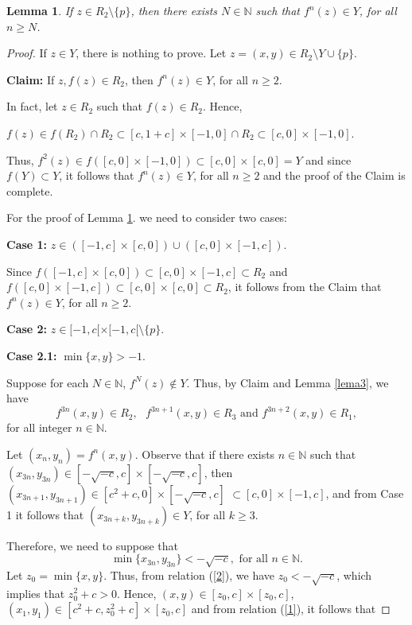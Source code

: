 \documentclass[11pt]{amsart}
\newtheorem{lemma}[theorem]{Lemma}
\theoremstyle{definition}
\begin{document}
\begin{lemma}
	If $z\in R_2\setminus \{p\}$, then there exists $N\in\mathbb{N}$ such that $f^n(z)\in Y$, for all $n\geq N$. \label{prop66}
\end{lemma}
\begin{proof}
If $z\in Y$, there is nothing to prove. Let $z=(x,y)\in R_2\setminus Y\cup \{p\}$.

\smallskip

\noindent \textbf{Claim:} If $z,f(z)\in R_2$, then $f^n(z)\in Y$, for all $n\geq 2$.

In fact, let $z\in R_2$ such that $f(z)\in R_2$. Hence,
\begin{center}
	$f(z)\in f(R_2)\cap R_2\subset [c,1+c]\times[-1,0]\cap R_2\subset [c,0]\times [-1,0]$.
\end{center}

Thus, $f^2(z)\in f([c,0]\times [-1,0])\subset [c,0]\times[c,0]=Y$ and since $f(Y)\subset Y$, it follows that $f^n(z)\in Y$, for all $n\geq 2$ and the proof of the
 	Claim is complete.

\smallskip

For the proof of Lemma \ref{prop66}. we need to consider two cases:

\textbf{Case 1:} $z\in ([-1,c]\times [c,0])\cup ([c,0]\times[-1,c])$.

\noindent Since $f([-1,c]\times [c,0])\subset [c,0]\times[-1,c]\subset R_2$ and $f([c,0]\times[-1,c])\subset [c,0]\times[c,0]\subset R_2$, it follows from the Claim that
$f^n(z)\in Y$, for all $n\geq 2$.

\textbf{Case 2:} $z\in[-1,c[\times[-1,c[\setminus \{p\}$.

\noindent \textbf{Case 2.1:} $\min\{x,y\}>-1$.

Suppose for each $N\in\mathbb{N}$, $f^N(z)\notin Y$. Thus, by Claim and Lemma \ref{lema3}, we have
\begin{equation}
f^{3n}(x,y)\in R_2, \textrm{ } f^{3n+1}(x,y)\in R_3 \textrm{ and } f^{3n+2}(x,y)\in R_1, \label{1}
\end{equation}
for all integer $n\in\mathbb{N}$.

Let $(x_n,y_n)=f^n(x,y)$. Observe that if there exists $n\in\mathbb{N}$ such that $(x_{3n},y_{3n})\in [-\sqrt{-c},c]\times[-\sqrt{-c},c]$, then $(x_{3n+1},y_{3n+1})\in [c^2+c,0]\times[-\sqrt{-c},c]$ $\subset [c,0]\times[-1,c]$, and from Case 1 it follows that $(x_{3n+k},y_{3n+k})\in Y$, for all $k\geq 3$.

Therefore, we need to suppose that 
\begin{equation}
\min\{x_{3n},y_{3n}\}<-\sqrt{-c}, \textrm{ for all } n\in\mathbb{N}. \label{2}
\end{equation}
Let $z_0=\min\{x,y\}$. Thus, from relation (\ref{2}), we have $z_0<-\sqrt{-c}$, which implies that $z_0^2+c>0$. Hence,
$(x,y)\in[z_0,c]\times[z_0,c]$, $(x_1,y_1)\in[c^2+c,z_0^2+c]\times[z_0,c]$ and from relation (\ref{1}), it follows that


\end{proof}
\end{document}

